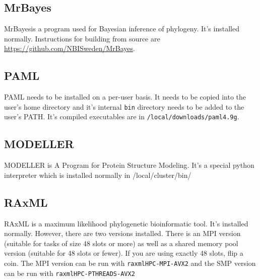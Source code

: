 \documentclass[]{book}
\theoremstyle{definition}
\theoremstyle{definition}
\theoremstyle{definition}
\theoremstyle{remark}
\begin{document}
\subsection{MrBayes}\label{mrbayes}

MrBayesis a program used for Bayesian inference of phylogeny. It's
installed normally. Instructions for building from source are
\href{Here}{https://github.com/NBISweden/MrBayes}.

\subsection{PAML}\label{paml}

PAML needs to be installed on a per-user basis. It needs to be copied
into the user's home directory and it's internal \texttt{bin} directory
needs to be added to the user's PATH. It's compiled executables are in
\texttt{/local/downloads/paml4.9g}.

\subsection{MODELLER}\label{modeller}

MODELLER is A Program for Protein Structure Modeling. It's a special
python interpreter which is installed normally in /local/cluster/bin/

\subsection{RAxML}\label{raxml}

RAxML is a maximum likelihood phylogenetic bioinformatic tool. It's
installed normally. However, there are two versions installed. There is
an MPI version (suitable for tasks of size 48 slots or more) as well as
a shared memory pool version (suitable for 48 slots or fewer). If you
are using exactly 48 slots, flip a coin. The MPI version can be run with
\texttt{raxmlHPC-MPI-AVX2} and the SMP version can be run with
\texttt{raxmlHPC-PTHREADS-AVX2}


\end{document}
